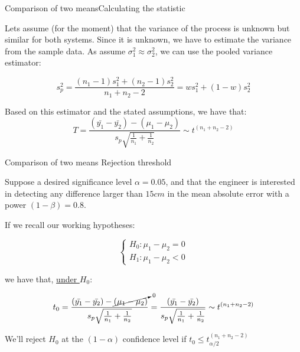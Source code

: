 \begin{frame}{Comparison of two means}{Calculating the statistic}

  Lets assume (for the moment) that the variance of the process is unknown but similar for both systems. Since it is unknown, we have to estimate the variance from the sample data. As assume $\sigma^2_1\approx\sigma^2_2$, we can use the pooled variance estimator:

\begin{equation*}
s_p^2 = \frac{\left(n_1-1\right)s_1^2+\left(n_2-1\right)s_2^2}{n_1+n_2-2}=ws_1^2+\left(1-w\right)s_2^2
\end{equation*}
\bigskip

Based on this estimator and the stated assumptions, we have that:
\begin{equation*}
T = \frac{\left(\bar{y_1} - \bar{y_2}\right) - \left(\mu_1 - \mu_2\right)}{s_p\sqrt{\frac{1}{n_1} + \frac{1}{n_2}}}\sim t^{\left(n_1+n_2-2\right)}
\end{equation*}
\end{frame}


\begin{frame}
{Comparison of two means}
{Rejection threshold}

Suppose a desired significance level $\alpha = 0.05$, and that the engineer is interested in detecting any difference larger than $15cm$ in the mean absolute error with a power $(1-\beta) = 0.8$.\medskip

If we recall our working hypotheses:

\begin{equation*}
\begin{cases}
H_0: \mu_1 - \mu_2 = 0\\
H_1: \mu_1 - \mu_2 < 0
\end{cases}
\end{equation*}

\noindent we have that, \underline{under $H_0$}:

\begin{equation*}
t_0 = \frac{\left(\bar{y_1} - \bar{y_2}\right) - \cancelto{0}{\left(\mu_1 - \mu_2\right)}}{s_p\sqrt{\frac{1}{n_1} + \frac{1}{n_2}}} = \frac{\left(\bar{y_1} - \bar{y_2}\right)}{s_p\sqrt{\frac{1}{n_1} + \frac{1}{n_2}}}\sim t^{\left(n_1+n_2-2\right)}
\end{equation*}

We'll reject $H_0$ at the $(1-\alpha)$ confidence level if $t_0\leq t^{(n_1+n_2-2)}_{\alpha/2}$
\end{frame}

